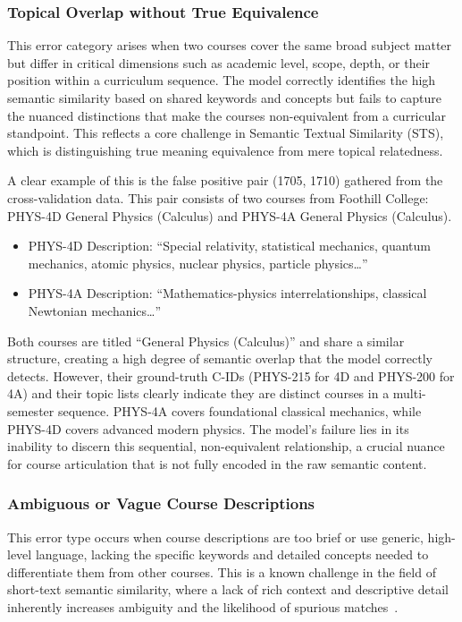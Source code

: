 \subsubsection{Topical Overlap without True Equivalence}
This error category arises when two courses cover the same broad subject matter but differ in critical dimensions such as academic level, scope, depth, or their position within a curriculum sequence. The model correctly identifies the high semantic similarity based on shared keywords and concepts but fails to capture the nuanced distinctions that make the courses non-equivalent from a curricular standpoint. This reflects a core challenge in Semantic Textual Similarity (STS), which is distinguishing true meaning equivalence from mere topical relatedness.

A clear example of this is the false positive pair (1705, 1710) gathered from the cross-validation data. This pair consists of two courses from Foothill College: PHYS-4D General Physics (Calculus) and PHYS-4A General Physics (Calculus).
\begin{itemize}
    \item PHYS-4D Description: ``Special relativity, statistical mechanics, quantum mechanics, atomic physics, nuclear physics, particle physics\dots''
    \item PHYS-4A Description: ``Mathematics-physics interrelationships, classical Newtonian mechanics\dots''
\end{itemize}
Both courses are titled ``General Physics (Calculus)'' and share a similar structure, creating a high degree of semantic overlap that the model correctly detects. However, their ground-truth C-IDs (PHYS-215 for 4D and PHYS-200 for 4A) and their topic lists clearly indicate they are distinct courses in a multi-semester sequence. PHYS-4A covers foundational classical mechanics, while PHYS-4D covers advanced modern physics. The model's failure lies in its inability to discern this sequential, non-equivalent relationship, a crucial nuance for course articulation that is not fully encoded in the raw semantic content.

\subsubsection{Ambiguous or Vague Course Descriptions}
This error type occurs when course descriptions are too brief or use generic, high-level language, lacking the specific keywords and detailed concepts needed to differentiate them from other courses. This is a known challenge in the field of short-text semantic similarity, where a lack of rich context and descriptive detail inherently increases ambiguity and the likelihood of spurious matches~\cite{app13063911}.


